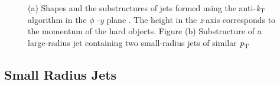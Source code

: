 \begin{figure}[H]
    \centering
    \qquad
    \caption{(a) Shapes and the substructures of jets formed using the anti-$\textrm{\textit{k}}_{\textrm{T}}$ algorithm in the $\phi$ -\textit{y} plane \cite{antikt}. The height in the \textit{z}-axis corresponds to the momentum of the hard objects. 
    Figure (b) Substructure of a large-radius jet containing two small-radius jets of similar $\textrm{\textit{p}}_{\textrm{T}}$ }
    \label{fig:antikt}
  \end{figure}

\subsection{Small Radius Jets}\label{sec:small-R}

